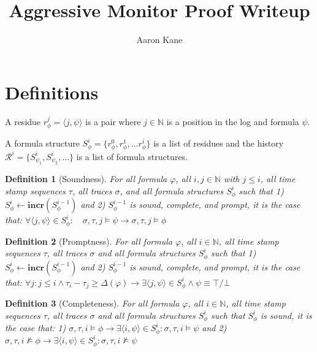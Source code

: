 \documentclass[10pt,a4paper]{article}
\title{Aggressive Monitor Proof Writeup}
\author{Aaron Kane}
\newcommand{\rp}[2]{\ensuremath{\langle #1, #2 \rangle}}
\newcommand{\res}[2]{\ensuremath{r_{#1}^{#2}}}
\newtheorem{tdef}{Definition}
\begin{document}
\maketitle

\section{Definitions}

A residue $\res{\phi}{j} = \rp{j}{\psi}$ is a pair where $j \in \mathbb{N}$ is a position in the log and formula $\psi$.

A formula structure $S_{\phi}^i = \{ r_{\phi}^0, r_{\phi}^1, \ldots r_{\phi}^i \}$ is a list of residues and the history $\mathcal{R}^i = \{ S_{\psi_1}^i, S_{\psi_2}^i,\ldots \}$ is a list of formula structures.



\begin{tdef}[Soundness] For all formula $\varphi$, all $i,j \in \mathbb{N}$ with $j \leq i$, all time stamp sequences $\tau$, all traces $\sigma$, and all formula structures $S^i_{\phi}$ such that 1) $S^i_{\phi} \leftarrow \mathbf{incr}(S^{i-1}_{\phi})$ and 2) $S^{i-1}_{\phi}$ is sound, complete, and prompt, it is the case that: 
%
$\forall \rp{j}{\psi} \in S^i_{\phi}: \quad \sigma, \tau, j \vDash \psi \rightarrow \sigma, \tau, j \vDash \phi$

\end{tdef}

\begin{tdef}[Promptness] For all formula $\varphi$, all $i \in \mathbb{N}$, all time stamp sequences $\tau$, all traces $\sigma$ and all formula structures $S^i_{\phi}$ such that 1) $S^i_{\phi} \leftarrow \mathbf{incr}(S^{i-1}_{\phi})$ and 2) $S^{i-1}_{\phi}$ is sound, complete, and prompt, it is the case that: $\forall j : j \leq i \wedge \tau_i - \tau_j \geq \Delta (\varphi) \rightarrow \exists \rp{j}{\psi} \in S^i_{\phi} \wedge \psi \equiv \top/\bot$

\end{tdef}
\begin{tdef}[Completeness] For all formula $\varphi$, all $i \in \mathbb{N}$, all time stamp sequences $\tau$, all traces $\sigma$ and all formula structures $S^i_{\phi}$ such that $S^i_{\phi}$ is sound, it is the case that: 1) $\sigma, \tau, i \vDash \phi \rightarrow \exists\rp{i}{\psi} \in S^i_{\phi}: \sigma, \tau, i \vDash \psi$ and 2) $\sigma, \tau, i \nvDash \phi \rightarrow \exists\rp{i}{\psi} \in S^i_{\phi}: \sigma, \tau, i \nvDash \psi$

\end{tdef}
\end{document}
